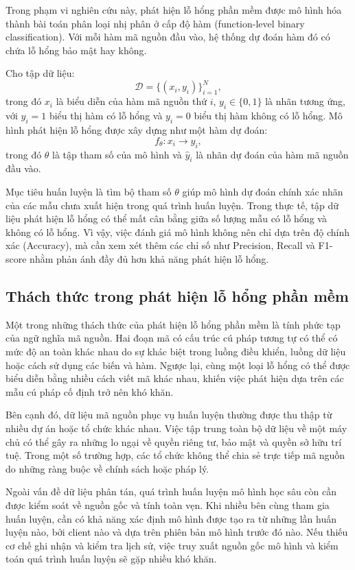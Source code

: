 Trong phạm vi nghiên cứu này, phát hiện lỗ hổng phần mềm được mô hình hóa thành bài toán phân loại
nhị phân ở cấp độ hàm (function-level binary classification). Với mỗi hàm mã nguồn đầu vào, hệ
thống dự đoán hàm đó có chứa lỗ hổng bảo mật hay không.

Cho tập dữ liệu:
\[
	\mathcal{D} = \{(x_i, y_i)\}_{i=1}^{N},
\]
trong đó $x_i$ là biểu diễn của hàm mã nguồn thứ $i$, $y_i \in \{0,1\}$ là nhãn tương ứng, với $y_i
	= 1$ biểu thị hàm có lỗ hổng và $y_i = 0$ biểu thị hàm không có lỗ hổng. Mô hình phát hiện lỗ hổng
được xây dựng như một hàm dự đoán:
\[
	f_{\theta}: x_i \rightarrow \hat{y}_i,
\]
trong đó $\theta$ là tập tham số của mô hình và $\hat{y}_i$ là nhãn dự đoán của hàm mã nguồn đầu
vào.

Mục tiêu huấn luyện là tìm bộ tham số $\theta$ giúp mô hình dự đoán chính xác nhãn của các mẫu chưa
xuất hiện trong quá trình huấn luyện. Trong thực tế, tập dữ liệu phát hiện lỗ hổng có thể mất cân
bằng giữa số lượng mẫu có lỗ hổng và không có lỗ hổng. Vì vậy, việc đánh giá mô hình không nên chỉ
dựa trên độ chính xác (Accuracy), mà cần xem xét thêm các chỉ số như Precision, Recall và F1-score
nhằm phản ánh đầy đủ hơn khả năng phát hiện lỗ hổng.

\subsection{Thách thức trong phát hiện lỗ hổng phần mềm}

Một trong những thách thức của phát hiện lỗ hổng phần mềm là tính phức tạp của ngữ nghĩa mã nguồn.
Hai đoạn mã có cấu trúc cú pháp tương tự có thể có mức độ an toàn khác nhau do sự khác biệt trong
luồng điều khiển, luồng dữ liệu hoặc cách sử dụng các biến và hàm. Ngược lại, cùng một loại lỗ hổng
có thể được biểu diễn bằng nhiều cách viết mã khác nhau, khiến việc phát hiện dựa trên các mẫu cú
pháp cố định trở nên khó khăn.

Bên cạnh đó, dữ liệu mã nguồn phục vụ huấn luyện thường được thu thập từ nhiều dự án hoặc tổ chức
khác nhau. Việc tập trung toàn bộ dữ liệu về một máy chủ có thể gây ra những lo ngại về quyền riêng
tư, bảo mật và quyền sở hữu trí tuệ. Trong một số trường hợp, các tổ chức không thể chia sẻ trực
tiếp mã nguồn do những ràng buộc về chính sách hoặc pháp lý.

Ngoài vấn đề dữ liệu phân tán, quá trình huấn luyện mô hình học sâu còn cần được kiểm soát về nguồn
gốc và tính toàn vẹn. Khi nhiều bên cùng tham gia huấn luyện, cần có khả năng xác định mô hình được
tạo ra từ những lần huấn luyện nào, bởi client nào và dựa trên phiên bản mô hình trước đó nào. Nếu
thiếu cơ chế ghi nhận và kiểm tra lịch sử, việc truy xuất nguồn gốc mô hình và kiểm toán quá trình
huấn luyện sẽ gặp nhiều khó khăn.

